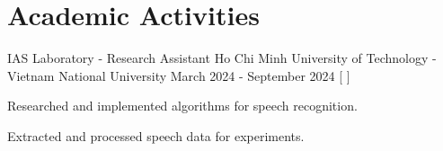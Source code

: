 \section{\textbf{Academic Activities}}
\vspace{-0.4mm}
\resumeSubHeadingListStart
\resumeProject
  {IAS Laboratory - Research Assistant}
  {Ho Chi Minh University of Technology - Vietnam National University}
  {March 2024 - September 2024}
  {{}[
    ]}
\resumeItemListStart
  \item Researched and implemented algorithms for speech recognition.
  \item Extracted and processed speech data for experiments.
\resumeItemListEnd


\resumeSubHeadingListEnd

\vspace{-6mm}